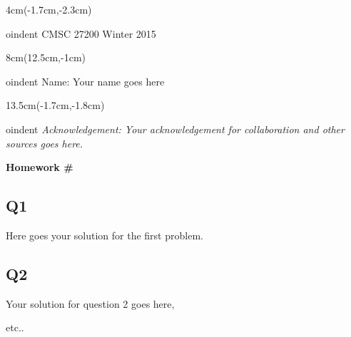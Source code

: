 \documentclass[12pt, oneside]{article}
\begin{document}


\begin{textblock*}{4cm}(-1.7cm,-2.3cm)

oindent {\scriptsize CMSC 27200 Winter 2015} 
\end{textblock*}

\begin{textblock*}{8cm}(12.5cm,-1cm)

oindent {Name: Your name goes here} 
\end{textblock*}
\begin{textblock*}{13.5cm}(-1.7cm,-1.8cm)

oindent \textit{\footnotesize Acknowledgement: Your acknowledgement for collaboration and other sources goes here. } 
\end{textblock*}

\vspace{1cm}

\begin{center}
\textbf{\Large Homework \#}
\end{center}


\subsection*{Q1} Here goes your solution for the first problem.



\subsection*{Q2}
Your solution for question 2 goes here, 


etc.. 
\end{document}

